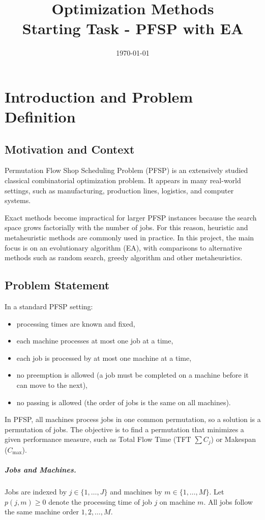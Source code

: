 \documentclass[12pt,a4paper]{report}
\title{Optimization Methods\\ Starting Task - PFSP with EA}
\author{\reportauthor}
\date{\today}
\begin{document}
\maketitle
\tableofcontents
\clearpage

\chapter{Introduction and Problem Definition}
\section{Motivation and Context}
Permutation Flow Shop Scheduling Problem (PFSP) is an extensively studied classical combinatorial optimization problem. It appears in many real-world settings, such as manufacturing, production lines, logistics, and computer systems.

Exact methods become impractical for larger PFSP instances because the search space grows factorially with the number of jobs. For this reason, heuristic and metaheuristic methods are commonly used in practice. In this project, the main focus is on an evolutionary algorithm (EA), with comparisons to alternative methods such as random search, greedy algorithm and other metaheuristics.

\section{Problem Statement}
In a standard PFSP setting:
\begin{itemize}
	\item processing times are known and fixed,
	\item each machine processes at most one job at a time,
	\item each job is processed by at most one machine at a time,
	\item no preemption is allowed (a job must be completed on a machine before it can move to the next),
    \item no passing is allowed (the order of jobs is the same on all machines).
\end{itemize}

In PFSP, all machines process jobs in one common permutation, so a solution is a permutation of jobs. The objective is to find a permutation that minimizes a given performance measure, such as Total Flow Time (TFT \(\sum C_j\)) or Makespan (\(C_{\max}\)).

\paragraph{Jobs and Machines.}
Jobs are indexed by $j\in \{1,\ldots,J\}$ and machines by $m\in \{1,\ldots,M\}$. Let $p(j,m)\ge 0$ denote the processing time of job $j$ on machine $m$. All jobs follow the same machine order $1,2,\ldots,M$.
\end{document}
